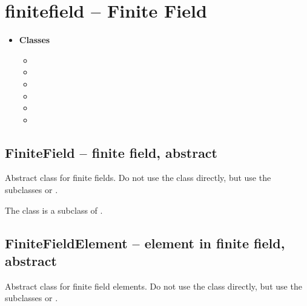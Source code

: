

\section{finitefield -- Finite Field}

 \begin{itemize}
   \item {\bf Classes}
   \begin{itemize}
     \item \negok {}
     \item \negok {}
     \item {}
     \item {}
     \item {}
     \item {}
   \end{itemize}
 \end{itemize}

\C

 \subsection{\negok FiniteField -- finite field, abstract}
 
 Abstract class for finite fields. Do not use the class directly, but use the subclasses  or .

 The class is a subclass of .
\C
 \subsection{\negok FiniteFieldElement -- element in finite field, abstract}
 Abstract class for finite field elements. Do not use the class directly, but use the subclasses  or .

